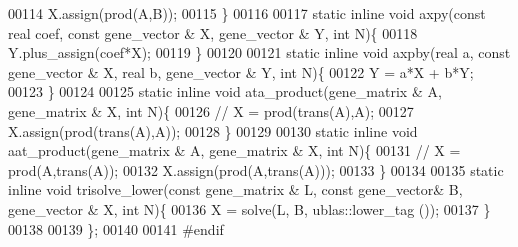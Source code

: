 \begin{DoxyCode}
00114     X.assign(prod(A,B));
00115   \}
00116 
00117   \textcolor{keyword}{static} \textcolor{keyword}{inline} \textcolor{keywordtype}{void} axpy(\textcolor{keyword}{const} real coef, \textcolor{keyword}{const} gene\_vector & X, gene\_vector & Y, \textcolor{keywordtype}{int} N)\{
00118     Y.plus\_assign(coef*X);
00119   \}
00120 
00121   \textcolor{keyword}{static} \textcolor{keyword}{inline} \textcolor{keywordtype}{void} axpby(real a, \textcolor{keyword}{const} gene\_vector & X, real b, gene\_vector & Y, \textcolor{keywordtype}{int} N)\{
00122     Y = a*X + b*Y;
00123   \}
00124 
00125   \textcolor{keyword}{static} \textcolor{keyword}{inline} \textcolor{keywordtype}{void} ata\_product(gene\_matrix & A, gene\_matrix & X, \textcolor{keywordtype}{int} N)\{
00126     \textcolor{comment}{// X =  prod(trans(A),A);}
00127     X.assign(prod(trans(A),A));
00128   \}
00129 
00130   \textcolor{keyword}{static} \textcolor{keyword}{inline} \textcolor{keywordtype}{void} aat\_product(gene\_matrix & A, gene\_matrix & X, \textcolor{keywordtype}{int} N)\{
00131     \textcolor{comment}{// X =  prod(A,trans(A));}
00132     X.assign(prod(A,trans(A)));
00133   \}
00134 
00135   \textcolor{keyword}{static} \textcolor{keyword}{inline} \textcolor{keywordtype}{void} trisolve\_lower(\textcolor{keyword}{const} gene\_matrix & L, \textcolor{keyword}{const} gene\_vector& B, gene\_vector & X, \textcolor{keywordtype}{int} N)\{
00136     X = solve(L, B, ublas::lower\_tag ());
00137   \}
00138 
00139 \};
00140 
00141 \textcolor{preprocessor}{#endif}
\end{DoxyCode}
